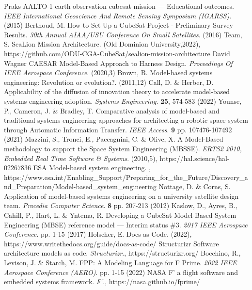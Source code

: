 \begin{thebibliography}{999}
    Praks AALTO-1 earth observation cubesat mission — Educational outcomes. {\em IEEE International Geoscience And Remote Sensing Symposium (IGARSS)}. (2015)
    Berthoud, M. How to Set Up a CubeSat Project - Preliminary Survey Results. {\em 30th Annual AIAA/USU Conference On Small Satellites}. (2016)
    Team, S. SeaLion Mission Architecture. (Old Dominion University,2022), https://github.com/ODU-CGA-CubeSat/sealion-mission-architecture
    David Wagner CAESAR Model-Based Approach to Harness Design. {\em Proceedings Of IEEE Aerospace Conference}. (2020,3)
    Brown, B. Model-based systems engineering: Revolution or evolution?.  (2011,12)
    Call, D. \& Herber, D. Applicability of the diffusion of innovation theory to accelerate model-based systems engineering adoption. {\em Systems Engineering}. \textbf{25}, 574-583 (2022)
    Younse, P., Cameron, J. \& Bradley, T. Comparative analysis of model-based and traditional systems engineering approaches for architecting a robotic space system through Automatic Information Transfer. {\em IEEE Access}. \textbf{9} pp. 107476-107492 (2021)
    Mazzini, S., Tronci, E., Paccagnini, C. \& Olive, X. A Model-Based methodology to support the Space System Engineering (MBSSE). {\em ERTS2 2010, Embedded Real Time Software \& Systems}. (2010,5), https://hal.science/hal-02267836
    ESA Model-based system engineering. , https://www.esa.int/Enabling\_Support/Preparing\_for\_the\_Future/Discovery\_and\_Preparation/Model-based\_system\_engineering
    Nottage, D. \& Corns, S. Application of model-based systems engineering on a university satellite design team. {\em Procedia Computer Science}. \textbf{8} pp. 207-213 (2012)
    Kaslow, D., Ayres, B., Cahill, P., Hart, L. \& Yntema, R. Developing a CubeSat Model-Based System Engineering (MBSE) reference model — Interim status \#3. {\em 2017 IEEE Aerospace Conference}. pp. 1-15 (2017)
    Holscher, E. Docs as Code.  (2022), https://www.writethedocs.org/guide/docs-as-code/
    Structurizr Software architecture models as code. {\em Structurizr}., https://structurizr.org/
    Bocchino, R., Levison, J. \& Starch, M. FPP: A Modeling Language for F Prime. {\em 2022 IEEE Aerospace Conference (AERO)}. pp. 1-15 (2022)
    NASA F' a flight software and embedded systems framework. {\em F'}., https://nasa.github.io/fprime/

\end{thebibliography}
